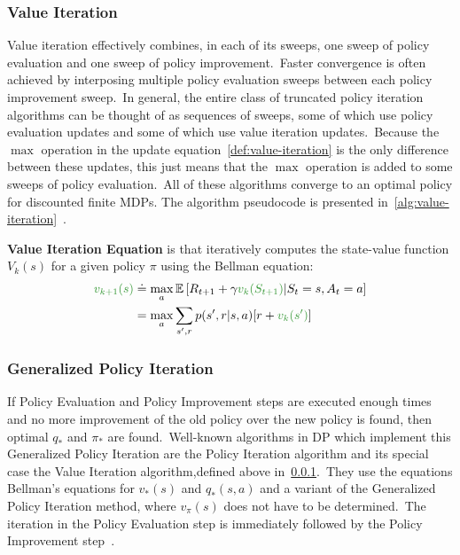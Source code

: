 \documentclass[../xlapes02]{subfiles}
\begin{document}
    \subsubsection{Value Iteration}\label{subsubsec:value-iteration}
    Value iteration effectively combines, in each of its sweeps, one sweep of policy evaluation and one sweep of policy improvement.\ Faster convergence is often achieved by interposing multiple policy evaluation sweeps between each policy improvement sweep.\ In general, the entire class of truncated policy iteration algorithms can be thought of as sequences of sweeps, some of which use policy evaluation updates and some of which use value iteration updates.\ Because the $\max$ operation in the update equation~\cref{def:value-iteration} is the only difference between these updates, this just means that the $\max$ operation is added to some sweeps of policy evaluation.\ All of these algorithms converge to an optimal policy for discounted finite MDPs. The algorithm pseudocode is presented in~\cref{alg:value-iteration}~\cite{sutton2018reinforcement}.

    \begin{definition}
        \label{def:value-iteration}
        \textbf{Value Iteration Equation} is that iteratively computes the state-value function $V_k(s)$ for a given policy $\pi$ using the Bellman equation:
        \begin{equation}
            \label{eq:value-iteration}
            \begin{split}
                \textcolor[RGB]{50,150,50}{v_{k+1}(s)}&\doteq\max_a\mathbb{E}\left[R_{t+1}+\gamma \textcolor[RGB]{50,150,50}{v_k(S_{t+1})}|S_t=s,A_t=a\right] \\
                &=\max_a\sum_{s',r}p(s',r|s,a)[r+\textcolor[RGB]{50,150,50}{v_k(s')}]
            \end{split}
        \end{equation}
    \end{definition}

    \subsubsection{Generalized Policy Iteration}\label{subsubsec:generalized-policy-iteration}
    If Policy Evaluation and Policy Improvement steps are executed enough times and no more improvement of the old policy over the new policy is found, then optimal $q_*$ and $\pi_*$ are found.\ Well-known algorithms in DP which implement this Generalized Policy Iteration are the Policy Iteration algorithm and its special case the Value Iteration algorithm,defined above in~\cref{subsubsec:value-iteration}.\ They use the equations Bellman's equations for $v_*(s)$ and $q_*(s,a)$ and a variant of the Generalized Policy Iteration method, where $v_{\pi}(s)$ does not have to be determined.\ The iteration in the Policy Evaluation step is immediately followed by the Policy Improvement step~\cite{sutton2018reinforcement, 7110602}.
\end{document}
